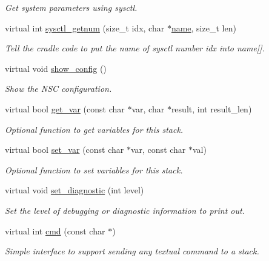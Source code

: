 \begin{DoxyCompactItemize}
\begin{DoxyCompactList}\small\item\em Get system parameters using sysctl. \end{DoxyCompactList}\item 
virtual int \hyperlink{structINetStack_a102073dbedc3c2f290658795ede66aa0}{sysctl\+\_\+getnum} (size\+\_\+t idx, char $\ast$\hyperlink{generate__test__data__lte__spectrum__model_8m_ab74e6bf80237ddc4109968cedc58c151}{name}, size\+\_\+t len)
\begin{DoxyCompactList}\small\item\em Tell the cradle code to put the name of sysctl number \textquotesingle{}idx\textquotesingle{} into name\mbox{[}\mbox{]}. \end{DoxyCompactList}\item 
virtual void \hyperlink{structINetStack_ac93016db66cb785cd922da2e933cec5b}{show\+\_\+config} ()
\begin{DoxyCompactList}\small\item\em Show the N\+SC configuration. \end{DoxyCompactList}\item 
virtual bool \hyperlink{structINetStack_a2245e510856bdda751196d2161e44bae}{get\+\_\+var} (const char $\ast$var, char $\ast$result, int result\+\_\+len)
\begin{DoxyCompactList}\small\item\em Optional function to get variables for this stack. \end{DoxyCompactList}\item 
virtual bool \hyperlink{structINetStack_a87dcc53b24d552658aa841d5149713e3}{set\+\_\+var} (const char $\ast$var, const char $\ast$val)
\begin{DoxyCompactList}\small\item\em Optional function to set variables for this stack. \end{DoxyCompactList}\item 
virtual void \hyperlink{structINetStack_a568cca15e43babd4483ff48ac39de10d}{set\+\_\+diagnostic} (int level)
\begin{DoxyCompactList}\small\item\em Set the level of debugging or diagnostic information to print out. \end{DoxyCompactList}\item 
virtual int \hyperlink{structINetStack_acdadbd6bddaa81e538a9fd88d90df883}{cmd} (const char $\ast$)
\begin{DoxyCompactList}\small\item\em Simple interface to support sending any textual command to a stack. \end{DoxyCompactList}\end{DoxyCompactItemize}


